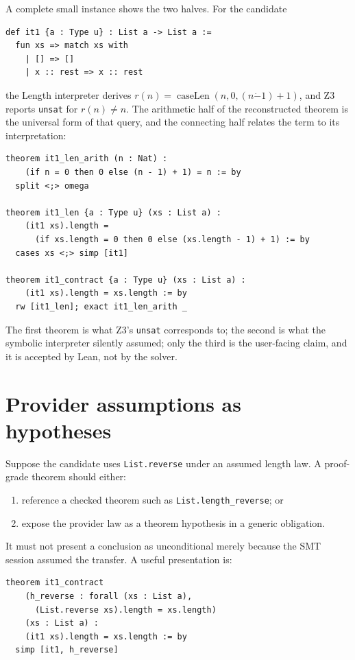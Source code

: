 \documentclass[11pt,oneside]{report}
\newcommand{\Zthree}{\textsc{Z3}\xspace}
\newcommand{\code}[1]{\texttt{#1}}
\begin{document}
A complete small instance shows the two halves. For the candidate
\begin{lstlisting}[language=LeanX]
def it1 {a : Type u} : List a -> List a :=
  fun xs => match xs with
    | [] => []
    | x :: rest => x :: rest
\end{lstlisting}
the Length interpreter derives $r(n)=\operatorname{caseLen}(n,0,(n\mathbin{\dot{-}}1)+1)$, and Z3 reports \texttt{unsat} for $r(n)\ne n$. The arithmetic half of the reconstructed theorem is the universal form of that query, and the connecting half relates the term to its interpretation:
\begin{lstlisting}[language=LeanX,caption={Reconstructed obligation for a length-preserving one-layer case.}]
theorem it1_len_arith (n : Nat) :
    (if n = 0 then 0 else (n - 1) + 1) = n := by
  split <;> omega

theorem it1_len {a : Type u} (xs : List a) :
    (it1 xs).length =
      (if xs.length = 0 then 0 else (xs.length - 1) + 1) := by
  cases xs <;> simp [it1]

theorem it1_contract {a : Type u} (xs : List a) :
    (it1 xs).length = xs.length := by
  rw [it1_len]; exact it1_len_arith _
\end{lstlisting}
The first theorem is what \Zthree's \texttt{unsat} corresponds to; the second is what the symbolic interpreter silently assumed; only the third is the user-facing claim, and it is accepted by Lean, not by the solver.

\section{Provider assumptions as hypotheses}

Suppose the candidate uses \code{List.reverse} under an assumed length law. A proof-grade theorem should either:

\begin{enumerate}[leftmargin=2em]
\item reference a checked theorem such as \code{List.length\_reverse}; or
\item expose the provider law as a theorem hypothesis in a generic obligation.
\end{enumerate}

It must not present a conclusion as unconditional merely because the SMT session assumed the transfer. A useful presentation is:

\begin{lstlisting}[language=LeanX,caption={Making a provider law explicit when no source theorem is linked.}]
theorem it1_contract
    (h_reverse : forall (xs : List a),
      (List.reverse xs).length = xs.length)
    (xs : List a) :
    (it1 xs).length = xs.length := by
  simp [it1, h_reverse]
\end{lstlisting}
\end{document}
